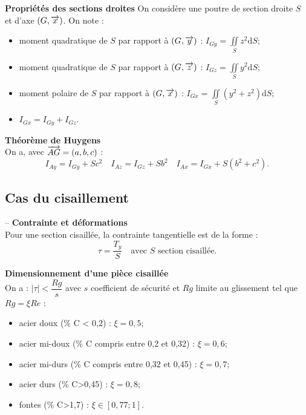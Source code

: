 \documentclass[10pt,fleqn]{article} %
\begin{document}
\begin{prop}
\textbf{Propriétés des sections droites}
On considère une poutre de section droite $S$ et d'axe $\left(G,\overrightarrow{x} \right)$. On note :
\begin{itemize}
\item moment quadratique de $S$ par rapport à $\left(G,\overrightarrow{y} \right)$ : $I_{Gy} = \iint\limits_S z^2 \text{d}S$;
\item moment quadratique de $S$ par rapport à $\left(G,\overrightarrow{z} \right)$ : $I_{Gz} = \iint\limits_S y^2 \text{d}S$;
\item moment polaire de $S$ par rapport à $\left(G,\overrightarrow{x} \right)$ : $I_{Gx} = \iint\limits_S \left( y^2 + z^2 \right) \text{d}S$;
\item $I_{Gx}=I_{Gy}+I_{Gz}$.
\end{itemize}
\end{prop}

\begin{theorem}
\textbf{Théorème de Huygens} ~\\
On a, avec $\overrightarrow{AG}=\left(a,b,c \right)$ :
$$
I_{Ay}=I_{Gy} + Sc^2 
\quad 
I_{Az}=I_{Gz} + Sb^2 
\quad 
I_{Ax}=I_{Gx} + S\left(b^2+c^2 \right). 
$$
\end{theorem}

\subsection*{Cas du cisaillement}

\begin{defi} -- 
\textbf{Contrainte et déformations} ~\\

Pour une section cisaillée, la contrainte tangentielle est de la forme : 
$$
\tau = \dfrac{T_y}{S} \quad \text{avec } S \text{ section cisaillée.}
$$
\end{defi}

\newpage

\begin{resultat}
\textbf{Dimensionnement d'une pièce cisaillée} ~\\
On a : $|\tau| < \dfrac{Rg}{s}$ avec $s$ coefficient de sécurité et $Rg$ limite au glissement tel que $Rg = \xi Re$ :
\begin{itemize}
\item acier doux (\% C < 0,2) : $\xi =0,5$;
\item acier mi-doux (\% C compris entre 0,2 et 0,32) : $\xi =0,6$;
\item acier mi-durs (\% C compris entre 0,32 et 0,45) : $\xi =0,7$;
\item acier durs (\% C>0,45) : $\xi =0,8$;
\item fontes (\% C>1,7) : $\xi \in [0,77;1]$.
\end{itemize}

\end{resultat}
\end{document}
